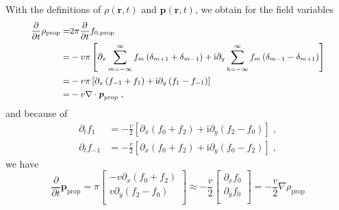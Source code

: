 \documentclass[10pt,aspectratio=43,mathserif,table]{beamer}
\begin{document}
\begin{frame}
    \small
    With the definitions of $\rho \left( \mathbf{r},t \right)$ and $\boldsymbol{p}\left( \mathbf{r},t \right)$, we obtain for the field variables
    \begin{equation}
        \small
        \begin{aligned}
            \frac{\partial}{\partial t}\rho _{\mathrm{prop}}=&2\pi \frac{\partial}{\partial t}f_{0,\mathrm{prop}}\\
            =&-v\pi \left[ \partial _x\sum_{m=-\infty}^{\infty}{f_{m}\left( \delta _{m+1}+\delta _{m-1} \right)} +\mathrm{i}\partial _y\sum_{k=-\infty}^{\infty}{f_{m}\left( \delta _{m-1}-\delta _{m+1} \right)} \right]\\
            =&-v\pi \left[ \partial _x\left( f_{-1}+f_{1} \right) +\mathrm{i}\partial _y\left( f_{1}-f_{-1} \right) \right]\\
            =&-v\nabla \cdot \boldsymbol{p}_{\mathrm{prop}}\;,\\
        \end{aligned}
    \end{equation}
    and because of 
    \begin{subequations}
        \begin{align}
            \partial _tf_{1}&=-\frac{v}{2}\left[ \partial _x\left( f_{0}+f_{2} \right) +\mathrm{i}\partial _y\left( f_{2}-f_{0} \right) \right] \;,\\
            \partial _tf_{-1}&=-\frac{v}{2}\left[ \partial _x\left( f_{0}+f_{2} \right) +\mathrm{i}\partial _y\left( f_{0}-f_{2} \right) \right] \;,
        \end{align}
    \end{subequations}
    we have
    \begin{equation}
        \frac{\partial}{\partial t}\boldsymbol{p}_{\mathrm{prop}}=\pi \left[ \begin{array}{c}
            -v\partial _x\left( f_{0}+f_{2} \right)\\
            v\partial _y\left( f_{2}-f_{0} \right)\\
        \end{array} \right] \approx -\frac{v}{2}\left[ \begin{array}{c}
            \partial _xf_{0}\\
            \partial _yf_{0}\\
        \end{array} \right] =-\frac{v}{2}\nabla \rho _{\mathrm{prop}}
    \end{equation}
\end{frame}
\end{document}
